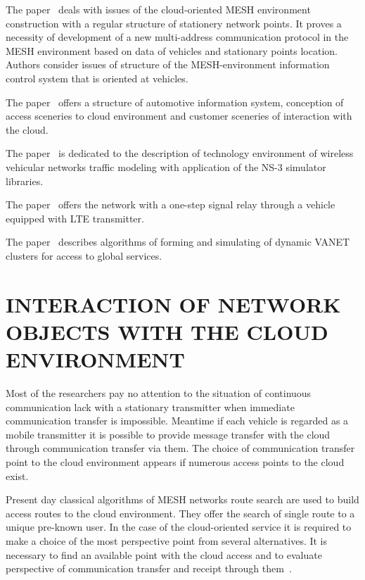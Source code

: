 \documentclass[a4paper,twoside]{article}
\begin{document}
The paper~\cite{6466777} deals with issues of the cloud-oriented MESH environment construction with a regular structure of stationery network points. It proves a necessity of development of a new multi-address communication protocol in the MESH environment based on data of vehicles and stationary points location. Authors consider issues of structure of the MESH-environment information control system that is oriented at vehicles.

The paper~\cite{6008765} offers a structure of automotive information system, conception of access sceneries to cloud environment and customer sceneries of interaction with the cloud.

The paper~\cite{6215525} is dedicated to the description of technology environment of wireless vehicular networks traffic modeling with application of the NS-3 simulator libraries.

The paper~\cite{6133884} offers the network with a one-step signal relay through a vehicle equipped with LTE transmitter.

The paper~\cite{5719268} describes algorithms of forming and simulating of dynamic VANET clusters for access to global services.

\section{INTERACTION OF NETWORK OBJECTS WITH THE CLOUD ENVIRONMENT}

Most of the researchers pay no attention to the situation of continuous communication lack with a stationary transmitter when immediate communication transfer is impossible. Meantime if each vehicle is regarded as a mobile transmitter it is possible to provide message transfer with the cloud through communication transfer via them. The choice of communication transfer point to the cloud environment appears if numerous access points to the cloud exist.

\begin{figure*}[!ht]
  \vspace{-0.2cm}
  \vspace{-0.1cm}
\end{figure*}

Present day classical algorithms of MESH networks route search are used to build access routes to the cloud environment. They offer the search of single route to a unique pre-known user. In the case of the cloud-oriented service it is required to make a choice of the most perspective point from several alternatives. It is necessary to find an available point with the cloud access and to evaluate perspective of communication transfer and receipt through them~\cite{gramaglia:seamless}.
\end{document}
